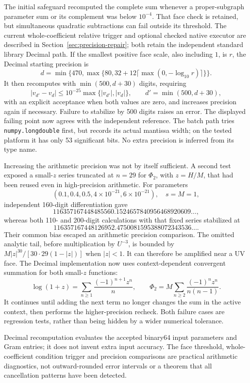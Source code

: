 The initial safeguard recomputed the complete sum whenever a
proper-subgraph parameter sum or its complement was below $10^{-4}$.
That face check is retained, but simultaneous quadratic subtractions
can fail outside its threshold. The current whole-coefficient relative
trigger and optional checked native executor are described in
Section~\ref{sec:precision-repair}; both retain the independent standard
library Decimal path. If the smallest positive face scale, also
including $1$, is $r$, the Decimal starting precision is
\[
 d=\min\{470,\max\{80,32+12\lceil\max(0,-\log_{10}r)\rceil\}\}.
\]
It then recomputes with $\min(500,d+30)$ digits, requiring
\[
 |v_{d'}-v_d|\le10^{-25}\max\{|v_{d'}|,|v_d|\},
 \qquad d'=\min(500,d+30),
\]
with an explicit acceptance when both values are zero, and increases
precision again if necessary. Failure to stabilize by
500 digits raises an error. The displayed failing point now agrees
with the independent reference.  The batch path tries
\texttt{numpy.longdouble} first, but records its actual mantissa width;
on the tested platform it has only 53 significant bits.  No extra
precision is inferred from its type name.

Increasing the arithmetic precision was not by itself sufficient.  A
second test exposed a small-$z$ series truncated at $n=29$ for
$\Phi_2$, with $z=H/M$, that had been reused even in high-precision
arithmetic.  For parameters
\[
 (0.1,0.4,0.5,4\times10^{-21},6\times10^{-21}),\quad s=M=1,
\]
independent 160-digit differentiation gave
\[
 116357167448485560.1524657840956468920609\ldots,
\]
whereas both 110- and 200-digit calculations with that fixed series
stabilized at
\[
 116357167448126952.4750081595388072343536\ldots.
\]
Their common bias escaped an arithmetic precision comparison.  The
omitted analytic tail, before multiplication by $U^{-3}$, is bounded by
$M|z|^{30}/[30\cdot29(1-|z|)]$ when $|z|<1$.  It can therefore be
amplified near a UV face.  The Decimal implementation now uses
context-dependent convergent summation for both small-$z$ functions:
\[
 \log(1+z)=\sum_{n\ge1}\frac{(-1)^{n+1}z^n}{n},\qquad
 \Phi_2=M\sum_{n\ge2}\frac{(-1)^nz^n}{n(n-1)}.
\]
It continues until adding the next term no longer changes the sum in
the active context, then performs the higher-precision recheck.  Both
failure cases are regression tests, rather than being hidden by a
wider numerical tolerance.

Decimal recomputation evaluates the accepted binary64 input parameters
and Gram entries; it does not invent extra input accuracy. The face
threshold, whole-coefficient condition trigger and precision comparisons
are practical arithmetic diagnostics,
not outward-rounded error intervals or a theorem that all cancellation
patterns have been detected.

